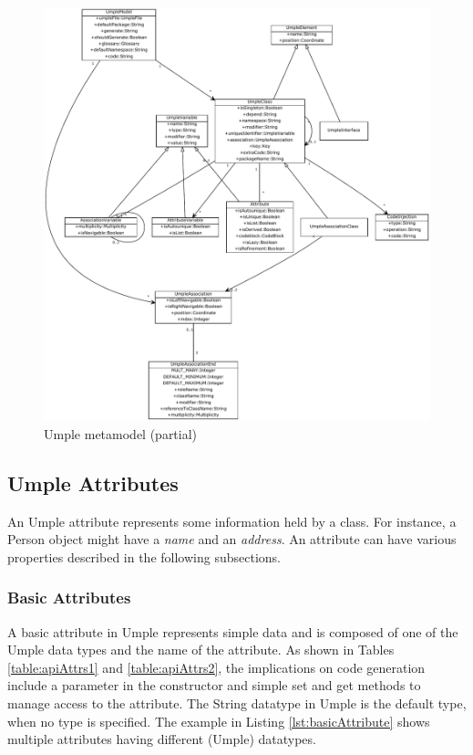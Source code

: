 \begin{figure}[H]
\includegraphics[width=1\textwidth]{Figures/metamodelUmple.pdf} 
\caption{Umple metamodel (partial)}
\label{fig:umpleMetamodel}
\end{figure}

\subsection{Umple Attributes}
\label{subsection:attributes}
An Umple attribute represents some information held by a class. For instance, 
a Person object might have a \textit{name} and an \textit{address}. 
An attribute can have various properties described in the following subsections.

\subsubsection{Basic Attributes}
A basic attribute in Umple represents simple data and is composed of one of the Umple data types and the name of the attribute. As shown in Tables \ref{table:apiAttrs1} and \ref{table:apiAttrs2}, the implications on code generation include a parameter in the constructor and simple set and get methods to manage access to the attribute. The String datatype in Umple is the default type, when no type is specified. The example in Listing \ref{lst:basicAttribute} shows multiple attributes having different (Umple) datatypes.

